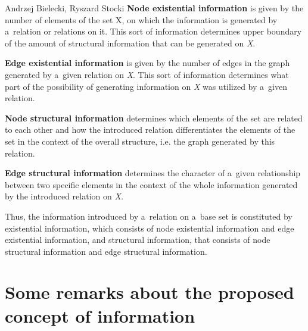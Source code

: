 \begin{artengenv2auth}{Andrzej Bielecki, Ryszard Stocki}
\textbf{Node existential information} is given by the number of elements of the set X, on which the information is generated by a~relation or relations on it. This sort of information determines upper boundary of the amount of structural information that can be generated on \textit{X}.



\textbf{Edge existential information} is given by the number of edges in the graph generated by a~given relation on \textit{X}. This sort of information determines what part of the possibility of generating information on \textit{X} was utilized by a~given relation.



\textbf{Node structural information} determines which elements of the set are related to each other and how the introduced relation differentiates the elements of the set in the context of the overall structure, i.e. the graph generated by this relation.



\textbf{Edge structural information} determines the character of a~given relationship between two specific elements in the context of the whole information generated by the introduced relation on \textit{X.}



Thus, the information introduced by a~relation on a~base set is constituted by existential information, which consists of node existential information and edge existential information, and structural information, that consists of node structural information and edge structural information.



\section{Some remarks about the proposed concept of information}


\end{artengenv2auth}
